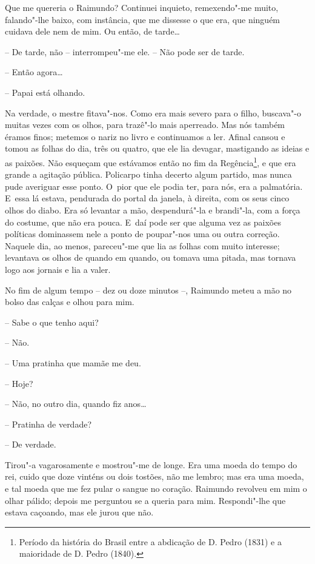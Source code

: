 Que me quereria o Raimundo? Continuei inquieto, remexendo"-me muito,
falando"-lhe baixo, com instância, que me dissesse o que era, que ninguém
cuidava dele nem de mim. Ou então, de tarde\ldots{}

-- De tarde, não -- interrompeu"-me ele. -- Não pode ser de tarde.

-- Então agora\ldots{}

-- Papai está olhando.

Na verdade, o mestre fitava"-nos. Como era mais severo para o filho,
buscava"-o muitas vezes com os olhos, para trazê"-lo mais aperreado. Mas
nós também éramos finos; metemos o nariz no livro e continuamos a ler.
Afinal cansou e tomou as folhas do dia, três ou quatro, que ele lia
devagar, mastigando as ideias e as paixões. Não esqueçam que estávamos
então no fim da Regência\footnote{Período da história do Brasil entre a
  abdicação de D. Pedro  (1831) e a maioridade de D. Pedro  (1840).},
e que era grande a agitação pública. Policarpo tinha decerto algum
partido, mas nunca pude averiguar esse ponto. O~pior que ele podia ter,
para nós, era a palmatória. E~essa lá estava, pendurada do portal da
janela, à direita, com os seus cinco olhos do diabo. Era só levantar a
mão, despendurá"-la e brandi"-la, com a força do costume, que não era
pouca. E~daí pode ser que alguma vez as paixões políticas dominassem
nele a ponto de poupar"-nos uma ou outra correção. Naquele dia, ao menos,
pareceu"-me que lia as folhas com muito interesse; levantava os olhos de
quando em quando, ou tomava uma pitada, mas tornava logo aos jornais e
lia a valer.

No fim de algum tempo -- dez ou doze minutos --, Raimundo meteu a mão no
bolso das calças e olhou para mim.

-- Sabe o que tenho aqui?

-- Não.

-- Uma pratinha que mamãe me deu.

-- Hoje?

-- Não, no outro dia, quando fiz anos\ldots{}

-- Pratinha de verdade?

-- De verdade.

Tirou"-a vagarosamente e mostrou"-me de longe. Era uma moeda do tempo do
rei, cuido que doze vinténs ou dois tostões, não me lembro; mas era uma
moeda, e tal moeda que me fez pular o sangue no coração. Raimundo
revolveu em mim o olhar pálido; depois me perguntou se a queria para
mim. Respondi"-lhe que estava caçoando, mas ele jurou que não.

